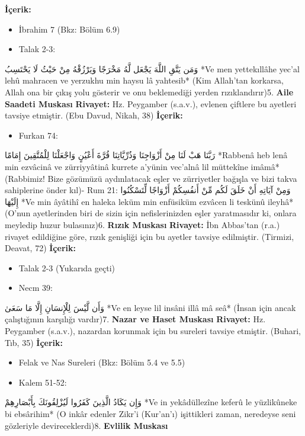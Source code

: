 \documentclass[12pt,a4paper]{article}
\begin{document}
\textbf{İçerik:}
\begin{itemize}
\item İbrahim 7 (Bkz: Bölüm 6.9)
\item Talak 2-3:
\end{itemize}
وَمَن يَتَّقِ اللَّهَ يَجْعَل لَّهُ مَخْرَجًا وَيَرْزُقْهُ مِنْ حَيْثُ لَا يَحْتَسِبُ
*Ve men yettekıllâhe yec'al lehû mahracen ve yerzukhu min haysu lâ yahtesib*
(Kim Allah'tan korkarsa, Allah ona bir çıkış yolu gösterir ve onu beklemediği yerden rızıklandırır)5. \textbf{Aile Saadeti Muskası}
\textbf{Rivayet:} Hz. Peygamber (s.a.v.), evlenen çiftlere bu ayetleri tavsiye etmiştir. (Ebu Davud, Nikah, 38)
\textbf{İçerik:}
\begin{itemize}
\item Furkan 74:
\end{itemize}
رَبَّنَا هَبْ لَنَا مِنْ أَزْوَاجِنَا وَذُرِّيَّاتِنَا قُرَّةَ أَعْيُنٍ وَاجْعَلْنَا لِلْمُتَّقِينَ إِمَامًا
*Rabbenâ heb lenâ min ezvâcinâ ve zürriyyâtinâ kurrete a'yünin vec'alnâ lil müttekîne imâmâ*
(Rabbimiz! Bize gözümüzü aydınlatacak eşler ve zürriyetler bağışla ve bizi takva sahiplerine önder kıl)- Rum 21:
وَمِنْ آيَاتِهِ أَنْ خَلَقَ لَكُم مِّنْ أَنفُسِكُمْ أَزْوَاجًا لِّتَسْكُنُوا إِلَيْهَا
*Ve min âyâtihî en haleka leküm min enfüsiküm ezvâcen li teskünû ileyhâ*
(O'nun ayetlerinden biri de sizin için nefislerinizden eşler yaratmasıdır ki, onlara meyledip huzur bulasınız)6. \textbf{Rızık Muskası}
\textbf{Rivayet:} İbn Abbas'tan (r.a.) rivayet edildiğine göre, rızık genişliği için bu ayetler tavsiye edilmiştir. (Tirmizi, Deavat, 72)
\textbf{İçerik:}
\begin{itemize}
\item Talak 2-3 (Yukarıda geçti)
\item Necm 39:
\end{itemize}
وَأَن لَّيْسَ لِلْإِنسَانِ إِلَّا مَا سَعَىٰ
*Ve en leyse lil insâni illâ mâ seâ*
(İnsan için ancak çalıştığının karşılığı vardır)7. \textbf{Nazar ve Haset Muskası}
\textbf{Rivayet:} Hz. Peygamber (s.a.v.), nazardan korunmak için bu sureleri tavsiye etmiştir. (Buhari, Tıb, 35)
\textbf{İçerik:}
\begin{itemize}
\item Felak ve Nas Sureleri (Bkz: Bölüm 5.4 ve 5.5)
\item Kalem 51-52:
\end{itemize}
وَإِن يَكَادُ الَّذِينَ كَفَرُوا لَيُزْلِقُونَكَ بِأَبْصَارِهِمْ
*Ve in yekâdüllezîne keferû le yüzlikûneke bi ebsârihim*
(O inkâr edenler Zikr'i (Kur'an'ı) işittikleri zaman, neredeyse seni gözleriyle devireceklerdi)8. \textbf{Evlilik Muskası}
\end{document}
